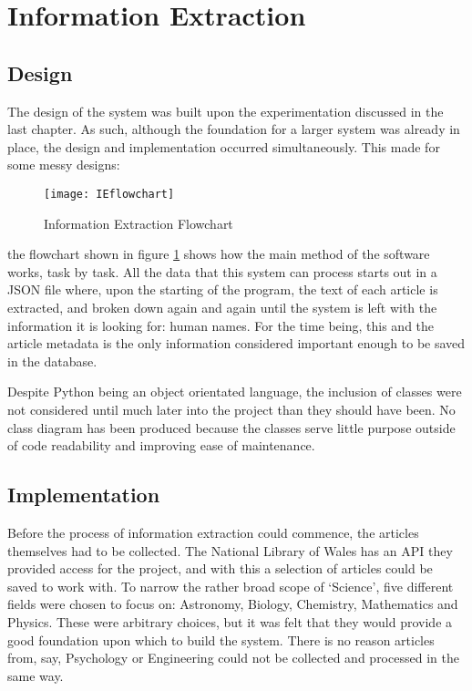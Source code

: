 \documentclass[11pt,a4paper]{book}
\begin{document}
\section{Information Extraction}

\subsection{Design}
The design of the system was built upon the experimentation discussed in the last chapter. As such, although the foundation for a larger system was already in place, the design and implementation occurred simultaneously. This made for some messy designs:
\begin{figure}
	\texttt{[image: IEflowchart]}
	\caption{Information Extraction Flowchart}
	\label{fig:IEchart}
\end{figure}
the flowchart shown in figure \ref{fig:IEchart} shows how the main method of the software works, task by task. All the data that this system can process starts out in a JSON file where, upon the starting of the program, the text of each article is extracted, and broken down again and again until the system is left with the information it is looking for: human names. For the time being, this and the article metadata is the only information considered important enough to be saved in the database.

Despite Python being an object orientated language, the inclusion of classes were not considered until much later into the project than they should have been. No class diagram has been produced because the classes serve little purpose outside of code readability and improving ease of maintenance.

\subsection{Implementation}
Before the process of information extraction could commence, the articles themselves had to be collected. The National Library of Wales has an API they provided access for the project, and with this a selection of articles could be saved to work with. To narrow the rather broad scope of `Science', five different fields were chosen to focus on: Astronomy, Biology, Chemistry, Mathematics and Physics. These were arbitrary choices, but it was felt that they would provide a good foundation upon which to build the system. There is no reason articles from, say, Psychology or Engineering could not be collected and processed in the same way. 
\end{document}
